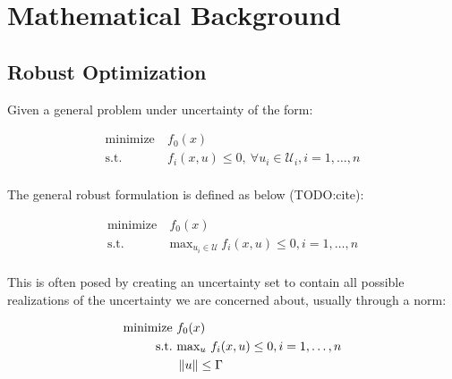 \section{Mathematical Background}

\subsection{Robust Optimization}

Given a general problem under uncertainty of the form:

\begin{align*}
    \text{minimize} &~f_0(x) \\
    \text{s.t.}     &~f_i(x,u) \leq 0,~\forall u_i \in \mathcal{U}_i, i = 1,\ldots,n \\
\end{align*}

The general robust formulation is defined as below (TODO:cite):

\begin{align*}
    \text{minimize} &~f_0(x) \\
    \text{s.t.}     &~\text{max}_{u_i \in \mathcal{U}}~f_i(x,u) \leq 0, i = 1,\ldots,n \\
\end{align*}


This is often posed by creating an uncertainty set to contain all possible
realizations of the uncertainty we are concerned about, usually through a norm:

\begin{align*}
    \text{minimize} &~f_0(x) \\
    \text{s.t.}     &~\text{max}_{u}~f_i(x,u) \leq 0, i = 1,\ldots,n \\
                    &~\left\lVert u\right\rVert \leq \Gamma \\
\end{align*}

